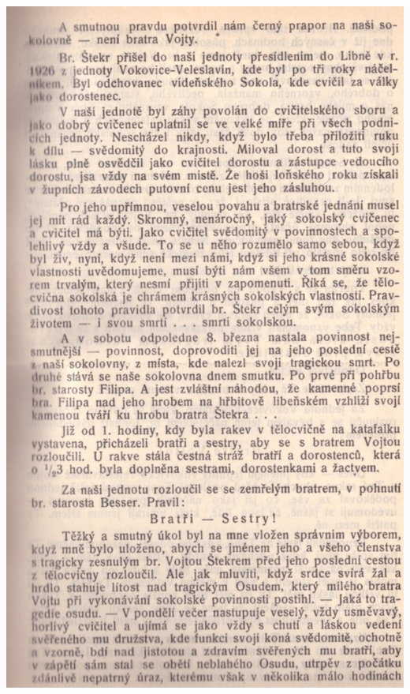 \documentclass[11pt]{article}
\begin{document}
\includegraphics[width=\imagewidth]{original/1930/Skener_20250407 (2).jpg}
\end{document}
